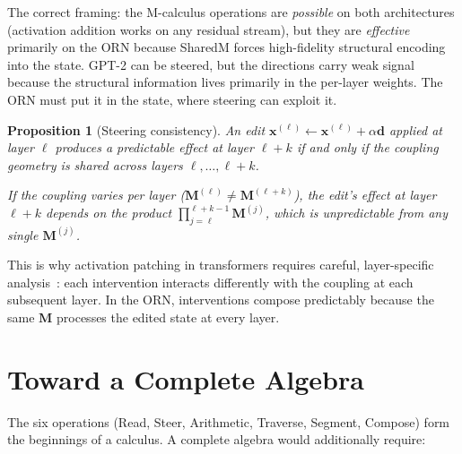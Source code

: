 \documentclass[11pt, a4paper]{article}
\newcommand{\M}{\mathbf{M}}
\newcommand{\x}{\mathbf{x}}
\theoremstyle{plain}
\newtheorem{proposition}{Proposition}
\theoremstyle{definition}
\theoremstyle{remark}
\begin{document}
The correct framing: the M-calculus operations are \emph{possible} on both architectures (activation addition works on any residual stream), but they are \emph{effective} primarily on the ORN because SharedM forces high-fidelity structural encoding into the state.
GPT-2 can be steered, but the directions carry weak signal because the structural information lives primarily in the per-layer weights.
The ORN must put it in the state, where steering can exploit it.

\begin{proposition}[Steering consistency]
\label{prop:steering}
An edit $\x^{(\ell)} \leftarrow \x^{(\ell)} + \alpha \mathbf{d}$ applied at layer $\ell$ produces a \emph{predictable} effect at layer $\ell + k$ if and only if the coupling geometry is shared across layers $\ell, \ldots, \ell+k$.

If the coupling varies per layer ($\M^{(\ell)} \neq \M^{(\ell+k)}$), the edit's effect at layer $\ell+k$ depends on the product $\prod_{j=\ell}^{\ell+k-1} \M^{(j)}$, which is unpredictable from any single $\M^{(j)}$.
\end{proposition}

This is why activation patching in transformers requires careful, layer-specific analysis~\cite{meng2022locating}: each intervention interacts differently with the coupling at each subsequent layer.
In the ORN, interventions compose predictably because the same $\M$ processes the edited state at every layer.

\section{Toward a Complete Algebra}
\label{sec:algebra}

The six operations (Read, Steer, Arithmetic, Traverse, Segment, Compose) form the beginnings of a calculus.
A complete algebra would additionally require:
\end{document}
